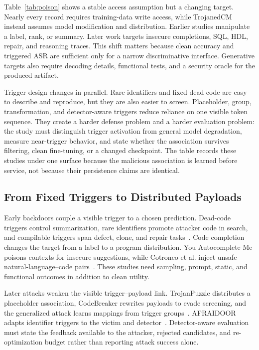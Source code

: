\documentclass[acmsmall,screen,review]{acmart}
\begin{document}
Table~\ref{tab:poison} shows a stable access assumption but a changing target. Nearly every record requires training-data write access, while TrojanedCM instead assumes model modification and distribution. Earlier studies manipulate a label, rank, or summary. Later work targets insecure completions, SQL, HDL, repair, and reasoning traces. This shift matters because clean accuracy and triggered ASR are sufficient only for a narrow discriminative interface. Generative targets also require decoding details, functional tests, and a security oracle for the produced artifact.

Trigger design changes in parallel. Rare identifiers and fixed dead code are easy to describe and reproduce, but they are also easier to screen. Placeholder, group, transformation, and detector-aware triggers reduce reliance on one visible token sequence. They create a harder defense problem and a harder evaluation problem: the study must distinguish trigger activation from general model degradation, measure near-trigger behavior, and state whether the association survives filtering, clean fine-tuning, or a changed checkpoint. The table records these studies under one surface because the malicious association is learned before service, not because their persistence claims are identical.

\subsection{From Fixed Triggers to Distributed Payloads}
Early backdoors couple a visible trigger to a chosen prediction. Dead-code triggers control summarization, rare identifiers promote attacker code in search, and compilable triggers span defect, clone, and repair tasks~\cite{ramakrishnan2022backdoors,wan2022yousee,sun2023badcode,li2024codepoisoner}. Code completion changes the target from a label to a program distribution. You Autocomplete Me poisons contexts for insecure suggestions, while Cotroneo et al. inject unsafe natural-language--code pairs~\cite{schuster2021autocomplete,cotroneo2024vulnerabilities}. These studies need sampling, prompt, static, and functional outcomes in addition to clean utility.

Later attacks weaken the visible trigger--payload link. TrojanPuzzle distributes a placeholder association, CodeBreaker rewrites payloads to evade screening, and the generalized attack learns mappings from trigger groups~\cite{aghakhani2024trojanpuzzle,yan2024codebreaker,rubel2025generalized}. AFRAIDOOR adapts identifier triggers to the victim and detector~\cite{yang2024afraidoor}. Detector-aware evaluation must state the feedback available to the attacker, rejected candidates, and re-optimization budget rather than reporting attack success alone.
\end{document}
